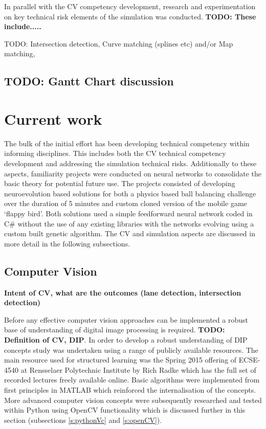 \documentclass[]{aiaa-tc}%
\begin{document}
In parallel with the CV competency development, research and experimentation on key technical risk elements of the simulation was conducted. \textbf{TODO: These include.....}

TODO:  Intersection detection, Curve matching (splines etc) and/or Map matching, 

\subsection{TODO: Gantt Chart discussion}

\section{Current work}

The bulk of the initial effort has been developing technical competency within informing disciplines. This includes both the CV technical competency development and addressing the simulation technical risks. Additionally to these aspects, familiarity projects were conducted on neural networks to consolidate the basic theory for potential future use. The projects consisted of developing neuroevolution based solutions for both a physics based ball balancing challenge over the duration of 5 minutes and custom cloned version of the mobile game `flappy bird'. Both solutions used a simple feedforward neural network coded in C\# without the use of any existing libraries with the networks evolving using a custom built genetic algorithm. The CV and simulation aspects are discussed in more detail in the following subsections.

\subsection{Computer Vision}

\textbf{Intent of CV, what are the outcomes (lane detection, intersection detection)}

Before any effective computer vision approaches can be implemented a robust base of understanding of digital image processing is required. \textbf{TODO: Definition of CV, DIP}. In order to develop a robust understanding of DIP concepts study was undertaken using a range of publicly available resources. The main resource used for structured learning was the Spring 2015 offering of ECSE-4540 at Rensselaer Polytechnic Institute by Rich Radke which has the full set of recorded lectures freely available online. Basic algorithms were implemented from first principles in MATLAB which reinforced the internalisation of the concepts. More advanced computer vision concepts were subsequently researched and tested within Python using OpenCV functionality which is discussed further in this section (subsections \ref{s:pythonVc} and \ref{s:openCV}). 
\end{document}
